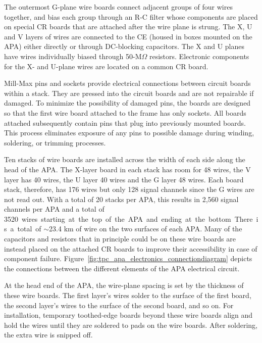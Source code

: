
The outermost G-plane wire boards connect adjacent groups of four wires together, and bias each group through an R-C filter whose components are placed on special CR boards  %
that are attached after the wire plane is strung. The X, U and V layers of wires are connected to the CE (housed in boxes mounted on the APA) either directly or through DC-blocking capacitors. The X and U planes have wires individually biased through 50-M$\Omega$ resistors. Electronic components for the X- and U-plane wires are located on a common CR board. 

Mill-Max pins and sockets provide electrical connections between circuit boards within a stack. They are pressed into the circuit boards and are not repairable if damaged. To minimize the possibility of damaged pins, the boards are designed so that the first wire board attached to the frame has only sockets. All boards attached subsequently contain pins that plug into previously mounted boards. This process eliminates exposure of any pins to possible damage during winding, soldering, or trimming processes.

Ten stacks of wire boards are installed across the width of each side along the head of the APA.  The X-layer board in each stack has room for 48 wires, the V layer has 40 wires, the U layer 40 wires and the G layer 48 wires.  Each board stack, therefore, has 176 wires but only 128 signal channels since the G wires are not read out.  
With a total of 20 stacks per APA, this results in 2,560 signal channels per APA and a total of \SI{3520} wires starting at the top of the APA and ending at the bottom.  There is a total of $\sim$23.4 km of wire on the two surfaces of each APA.  Many of the capacitors and resistors that in principle could be on these wire boards are instead
placed on the attached CR boards to improve their accessibility in case of component failure.   Figure~\ref{fig:tpc_apa_electronics_connectiondiagram} depicts the connections between the different elements of the APA electrical circuit. 

At the head end of the APA, the wire-plane spacing is set by the thickness of these wire boards.  The first layer's wires solder to the surface of the first board, the second layer's wires to the surface of the second board, and so on.  For installation, temporary toothed-edge boards beyond these wire boards align and hold the wires until they are soldered to pads on the wire boards.  After soldering, the extra wire is snipped off. 

